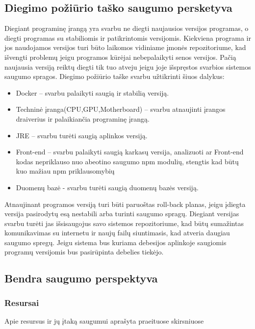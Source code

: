 \documentclass{VUMIFPSmagistrinis}
\begin{document}
			\subsection{Diegimo požiūrio taško saugumo persketyva}
				Diegiant programinę įrangą yra svarbu ne diegti naujausios versijos programas, o diegti programas su stabiliomis ir patikrintomis versijomis.
				Kiekviena programa ir jos naudojamos versijos turi būto laikomos vidiniame įmonės repozitoriume, kad išvengti problemų jeigu programos kūrėjai nebepalaikyti senos versijos.
				Pačią naujausia versiją reiktų diegti tik tuo atveju jeigu joje išspręstos svarbios sistemos saugumo spragos. 
				Diegimo požiūrio taške svarbu užtikrinti šiuos dalykus:
				\begin{itemize}
					\item{Docker -- svarbu palaikyti saugią ir stabilią versiją.}
					\item{Techninė įranga(CPU,GPU,Motherboard) -- svarbu atnaujinti įrangos draiverius ir palaikiančia programinę įrangą.}
					\item{JRE -- svarbu turėti saugią aplinkos versiją.}
					\item{Front-end -- svarbu palaikyti saugią karkasų versija, analizuoti ar Front-end kodas nepriklauso nuo abeotino saugumo npm modulių, stengtis kad būtų kuo mažiau npm priklausomybių}
					\item{Duomenų bazė - svarbu turėti saugią duomenų bazės versiją.}
				\end{itemize}
				Atnaujinant programos versiją turi būti paruoštas roll-back planas, jeigu įdiegta versija pasirodytų esą nestabili arba turinti saugumo spragų.
				Diegiant versijas svarbu turėti jas išsisaugojus savo sistemos repozitoriume, kad būtų sumažintas komunikavimas su internetu ir naujų failų siuntimasis, kad atveria daugiau saugumo spregų.
				Jeigu sistema bus kuriama debesijos aplinkoje saugiomis programų versijomis bus pasirūpinta debelies tiekėjo.
			\subsection{Bendra saugumo perspektyva}
				\subsubsection{Resursai}
					Apie resursus ir jų įtaką saugumui aprašyta praeituose skirsniuose
\end{document}
